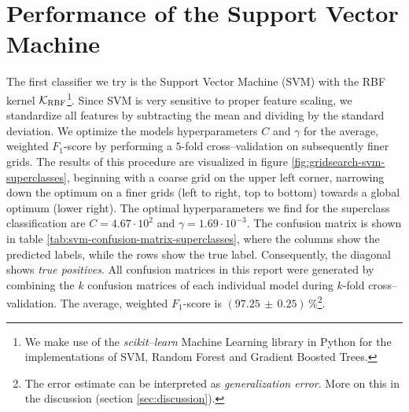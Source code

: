 \section{Performance of the Support Vector Machine}
\label{sec:performance-svm}

The first classifier we try is the Support Vector Machine (SVM) with the RBF kernel $\mathcal{K}_{\text{RBF}}$\footnote{We make use of the \emph{scikit--learn} \citep{scikit-learn} Machine Learning library in Python for the implementations of SVM, Random Forest and Gradient Boosted Trees.}. Since SVM is very sensitive to proper feature scaling, we standardize all features by subtracting the mean and dividing by the standard deviation. We optimize the models hyperparameters $C$ and $\gamma$ for the average, weighted $F_1$-score by performing a $5$-fold cross--validation on subsequently finer grids. The results of this procedure are visualized in figure \ref{fig:gridsearch-svm-superclasses}, beginning with a coarse grid on the upper left corner, narrowing down the optimum on a finer grids (left to right, top to bottom) towards a global optimum (lower right). The optimal hyperparameters we find for the superclass classification are $C = 4.67 \cdot 10^{2}$ and $\gamma = 1.69 \cdot 10^{-3}$. The confusion matrix is shown in table \ref{tab:svm-confusion-matrix-superclasses}, where the columns show the predicted labels, while the rows show the true label. Consequently, the diagonal shows \emph{true positives}. All confusion matrices in this report were generated by combining the $k$ confusion matrices of each individual model during $k$-fold cross--validation. The average, weighted $F_1$-score is $(97.25 \, \pm \, 0.25) \, \%$\footnote{The error estimate can be interpreted as \emph{generalization error}. More on this in the discussion (section \ref{sec:discussion}).}.\\

